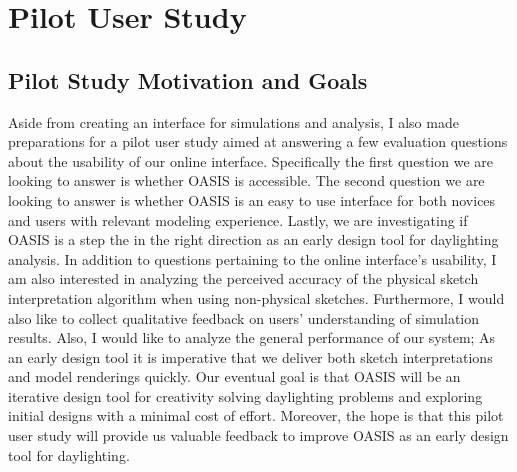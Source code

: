 \chapter{Pilot User Study} \label{sec:userstudy}

\section{Pilot Study Motivation and Goals}
	Aside from creating an interface for simulations and analysis, I also made preparations for a pilot user study aimed at answering a few evaluation questions about the usability of our online interface.
	Specifically the first question we are looking to answer is whether OASIS is accessible.
	The second question we are looking to answer is whether OASIS is an easy to use interface for both novices and users with relevant modeling experience.
	Lastly, we are investigating if OASIS is a step the in the right direction as an early design tool for daylighting analysis.
	In addition to questions pertaining to the online interface's usability, I am also interested in analyzing the perceived accuracy of the physical sketch interpretation algorithm when using non-physical sketches.
	Furthermore, I would also like to collect qualitative feedback on users' understanding of simulation results.
	Also, I would like to analyze the general performance of our system;
	As an early design tool it is imperative that we deliver both sketch interpretations and model renderings quickly.
	Our eventual goal is that OASIS will be an iterative design tool for creativity solving daylighting problems and exploring initial designs with a minimal cost of effort.
	Moreover, the hope is that this pilot user study will provide us valuable feedback to improve OASIS as an early design tool for daylighting.\\

